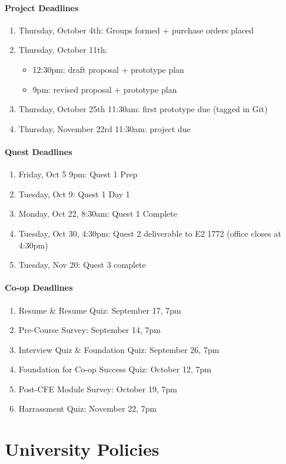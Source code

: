 \documentclass[11pt,onecolumn]{article}
\newcommand{\bi}{\begin{itemize}}
\newcommand{\ei}{\end{itemize}}
\newcommand{\be}{\begin{enumerate}}
\newcommand{\ee}{\end{enumerate}}
\newcommand{\biTight}{\vspace{-\parskip}\bi\setlength{\itemsep}{0pt}\setlength{\parskip}{0pt} }
\newcommand{\beTight}{\vspace{-\parskip}\be\setlength{\itemsep}{0pt}\setlength{\parskip}{0pt} }
\begin{document}
\paragraph{Project Deadlines}
\beTight
    \item Thursday, October 4th: Groups formed + purchase orders
    placed
    \item Thursday, October 11th: 
        \biTight
            \item 12:30pm: draft proposal + prototype plan
            \item 9pm: revised proposal + prototype plan
        \ei
    \item Thursday, October 25th 11:30am: first prototype due (tagged in Git)
    \item Thursday, November 22rd 11:30am: project due
\ee

\paragraph{Quest Deadlines}

\beTight
    \item Friday, Oct 5 9pm: Quest 1 Prep
    \item Tuesday, Oct 9: Quest 1 Day 1
    \item Monday, Oct 22, 8:30am: Quest 1 Complete
    \item Tuesday, Oct 30, 4:30pm: Quest 2 deliverable to E2 1772 (office closes at 4:30pm)
    \item Tuesday, Nov 20: Quest 3 complete
\ee


\paragraph{Co-op Deadlines}

\beTight
    \item Resume \& Resume Quiz: September 17, 7pm
    \item Pre-Course Survey: September 14, 7pm
    \item Interview Quiz \& Foundation Quiz: September 26, 7pm
    \item Foundation for Co-op Success Quiz: October 12, 7pm
    \item Post-CFE Module Survey: October 19, 7pm
    \item Harrassment Quiz: November 22, 7pm
\ee



\section{University Policies}
\end{document}

